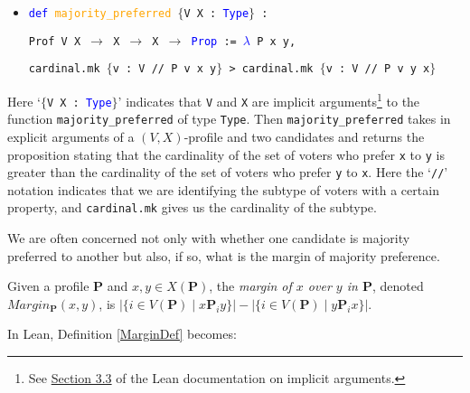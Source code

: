 \documentclass[runningheads]{llncs}
\begin{document}
\begin{itemize}
\item[] \texttt{\textcolor{blue}{def} \textcolor{orange}{majority\_preferred}  $\{$V X : \textcolor{blue}{Type}$\}$ :}

\texttt{Prof V X $\to$ X $\to$ X $\to$ \textcolor{blue}{Prop} := \textcolor{blue}{$\lambda$} P x y,}

\texttt{cardinal.mk $\{$v : V // P v x y$\}$ >
cardinal.mk $\{$v : V // P v y x$\}$}
\end{itemize}
Here `\texttt{$\{$V X : \textcolor{blue}{Type}$\}$}' indicates that \texttt{V} and \texttt{X} are implicit arguments\footnote{See \href{https://leanprover.github.io/reference/expressions.html\#implicit-arguments}{Section 3.3} of the Lean documentation on implicit arguments.} to the function \texttt{majority\_preferred} of type \texttt{Type}. Then \texttt{majority\_preferred} takes in explicit arguments of a $(V,X)$-profile and two candidates  and returns the proposition stating that the cardinality of the set of voters who prefer \texttt{x} to \texttt{y} is greater than the cardinality of the set of voters who prefer \texttt{y} to \texttt{x}. Here the `\texttt{//}' notation indicates that we are identifying the subtype of voters with a certain property, and \texttt{cardinal.mk} gives us the cardinality of the subtype.


We are often concerned not only with whether one candidate is majority preferred to another but also, if so, what is the margin of majority preference.

\begin{definition}\label{MarginDef} \textnormal{Given a profile $\mathbf{P}$ and $x,y\in X(\mathbf{P})$, the \textit{margin of $x$ over $y$ in $\mathbf{P}$}, denoted $Margin_\mathbf{P}(x,y)$, is $|\{i\in V(\mathbf{P})\mid x\mathbf{P}_iy\}|-|\{i\in V(\mathbf{P})\mid y\mathbf{P}_ix\}|$.}
\end{definition}
\noindent In Lean, Definition \ref{MarginDef} becomes:
\end{document}
